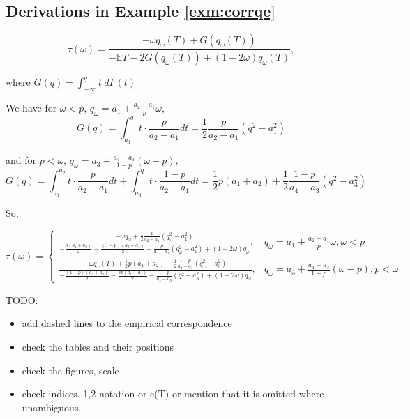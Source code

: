 \documentclass[
]{article}
\providecommand{\tightlist}{%
  \setlength{\itemsep}{0pt}\setlength{\parskip}{0pt}}
\theoremstyle{definition}
\theoremstyle{definition}
\theoremstyle{definition}
\theoremstyle{definition}
\theoremstyle{remark}
\begin{document}
\hypertarget{derivations-in-example-refexmcorrqe}{%
\subsection{Derivations in Example \ref{exm:corrqe}}\label{derivations-in-example-refexmcorrqe}}

\[\tau(\omega)=\frac{-\omega q_\omega(T) + G(q_\omega(T))}{-\mathbb ET - 2G(q_\omega(T)) + (1-2\omega)q_\omega(T)},\]

where \(G(q) = \int_{-\infty}^qt~dF(t)\)

We have
for \(\omega <p\), \(q_\omega= a_1 + \frac{a_2-a_1} p\omega\),
\[G(q) = \int_{a_1}^q t\cdot\frac p{a_2-a_1}dt = \frac 12 \frac p{a_2-a_1}(q^2-a_1^2)\]

and for \(p<\omega\), \(q_\omega = a_3 + \frac{a_4-a_3}{1-p}(\omega-p),\)
\[G(q) = \int_{a_1}^{a_2} t\cdot\frac p{a_2-a_1}dt + \int_{a_3}^q t\cdot\frac {1-p}{a_2-a_1}dt = \frac 12 p(a_1+a_2) + \frac 12 \frac {1-p}{a_4-a_3}(q^2-a_3^2)\]

So,

\[\tau(\omega)=\begin{cases}
\frac{-\omega q_\omega+ \frac 12 \frac p{a_2-a_1}(q_\omega^2-a_1^2)}{-\frac{p(a_1+a_2)}{2}-\frac{(1-p)(a_3+a_4)}{2} - \frac p{a_2-a_1}(q_\omega^2-a_1^2) + (1-2\omega)q_\omega},&q_\omega= a_1 + \frac{a_2-a_1} p\omega, \omega <p\\
\frac{-\omega q_\omega(T) + \frac 12 p(a_1+a_2) + \frac 12 \frac {1-p}{a_4-a_3}(q_\omega^2-a_3^2)}{-\frac{(1-p)(a_3+a_4)}{2} - \frac{3p(a_1+a_2)}2 - \frac {1-p}{a_4-a_3}(q^2-a_3^2) + (1-2\omega)q_\omega},&q_\omega = a_3 + \frac{a_4-a_3}{1-p}(\omega-p), p<\omega
\end{cases}.\]

TODO:

\begin{itemize}
\tightlist
\item
  add dashed lines to the empirical correspondence
\item
  check the tables and their positions
\item
  check the figures, scale
\item
  check indices, 1,2 notation or e(T) or mention that it is omitted where unambiguous.
\end{itemize}
\end{document}
